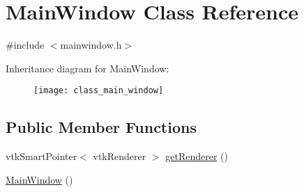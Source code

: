 \hypertarget{class_main_window}{}\section{Main\+Window Class Reference}
\label{class_main_window}


{\ttfamily \#include $<$mainwindow.\+h$>$}

Inheritance diagram for Main\+Window\+:\begin{figure}[H]
\begin{center}
\leavevmode
\texttt{[image: class\_main\_window]}
\end{center}
\end{figure}
\subsection*{Public Member Functions}
\begin{DoxyCompactItemize}
\item 
vtk\+Smart\+Pointer$<$ vtk\+Renderer $>$ \hyperlink{class_main_window_a2fb384b2232488ced24aad4237e0290e}{get\+Renderer} ()
\item 
\hyperlink{class_main_window_a34c4b4207b46d11a4100c9b19f0e81bb}{Main\+Window} ()
\end{DoxyCompactItemize}
